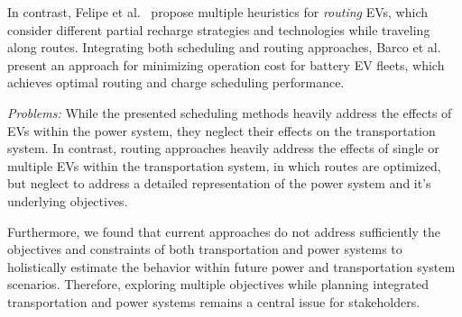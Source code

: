 In contrast, Felipe et al.~\cite{felipe2014heuristic} propose multiple heuristics for \textit{routing} EVs, which consider different partial recharge strategies and technologies while traveling along routes. 
Integrating both scheduling and routing approaches, Barco et al.~\cite{barco2013optimal} present an approach for minimizing operation cost for battery EV fleets, which achieves optimal routing and charge scheduling performance.


\textit{Problems:} While the presented scheduling methods heavily address the effects of EVs within the power system, they neglect their effects on the transportation system. In contrast, routing approaches heavily address the effects of single or multiple EVs within the transportation system, in which routes are optimized, but neglect to address a detailed representation of the power system and it's underlying objectives. 


Furthermore, we found that current approaches do not address sufficiently the objectives and constraints of both transportation and power systems to holistically estimate the behavior within future power and transportation system scenarios. Therefore, exploring multiple objectives while planning integrated transportation and power systems remains a central issue for stakeholders. 


